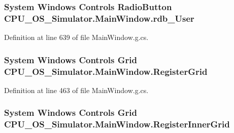 \subsubsection[{rdb\+\_\+\+User}]{\setlength{\rightskip}{0pt plus 5cm}System Windows Controls Radio\+Button C\+P\+U\+\_\+\+O\+S\+\_\+\+Simulator.\+Main\+Window.\+rdb\+\_\+\+User\hspace{0.3cm}{\ttfamily [package]}}\label{class_c_p_u___o_s___simulator_1_1_main_window_ab9e8d52c337bc24a24d8282dfbf449c8}


Definition at line 639 of file Main\+Window.\+g.\+cs.

\hypertarget{class_c_p_u___o_s___simulator_1_1_main_window_a37acb139db0aa54950350fdb47dfd452}{}
\subsubsection[{Register\+Grid}]{\setlength{\rightskip}{0pt plus 5cm}System Windows Controls Grid C\+P\+U\+\_\+\+O\+S\+\_\+\+Simulator.\+Main\+Window.\+Register\+Grid\hspace{0.3cm}{\ttfamily [package]}}\label{class_c_p_u___o_s___simulator_1_1_main_window_a37acb139db0aa54950350fdb47dfd452}


Definition at line 463 of file Main\+Window.\+g.\+cs.

\hypertarget{class_c_p_u___o_s___simulator_1_1_main_window_a27d2d9e2ed92e2daa444ca8086a0861e}{}
\subsubsection[{Register\+Inner\+Grid}]{\setlength{\rightskip}{0pt plus 5cm}System Windows Controls Grid C\+P\+U\+\_\+\+O\+S\+\_\+\+Simulator.\+Main\+Window.\+Register\+Inner\+Grid\hspace{0.3cm}{\ttfamily [package]}}\label{class_c_p_u___o_s___simulator_1_1_main_window_a27d2d9e2ed92e2daa444ca8086a0861e}


